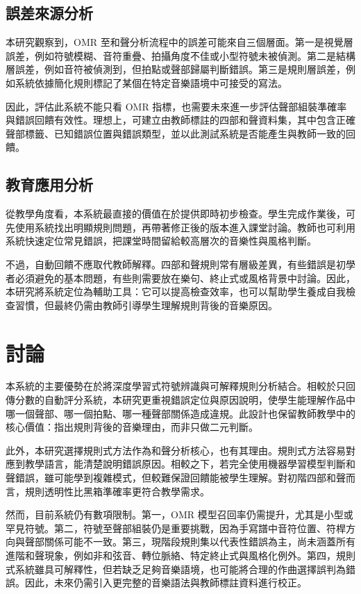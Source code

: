 \documentclass[12pt,a4paper]{article}
\begin{document}
\subsection{誤差來源分析}

本研究觀察到，OMR 至和聲分析流程中的誤差可能來自三個層面。第一是視覺層誤差，例如符號模糊、音符重疊、拍攝角度不佳或小型符號未被偵測。第二是結構層誤差，例如音符被偵測到，但拍點或聲部歸屬判斷錯誤。第三是規則層誤差，例如系統依據簡化規則標記了某個在特定音樂語境中可接受的寫法。

因此，評估此系統不能只看 OMR 指標，也需要未來進一步評估聲部組裝準確率與錯誤回饋有效性。理想上，可建立由教師標註的四部和聲資料集，其中包含正確聲部標籤、已知錯誤位置與錯誤類型，並以此測試系統是否能產生與教師一致的回饋。

\subsection{教育應用分析}

從教學角度看，本系統最直接的價值在於提供即時初步檢查。學生完成作業後，可先使用系統找出明顯規則問題，再帶著修正後的版本進入課堂討論。教師也可利用系統快速定位常見錯誤，把課堂時間留給較高層次的音樂性與風格判斷。

不過，自動回饋不應取代教師解釋。四部和聲規則常有層級差異，有些錯誤是初學者必須避免的基本問題，有些則需要放在樂句、終止式或風格背景中討論。因此，本研究將系統定位為輔助工具：它可以提高檢查效率，也可以幫助學生養成自我檢查習慣，但最終仍需由教師引導學生理解規則背後的音樂原因。

\section{討論}

本系統的主要優勢在於將深度學習式符號辨識與可解釋規則分析結合。相較於只回傳分數的自動評分系統，本研究更重視錯誤定位與原因說明，使學生能理解作品中哪一個聲部、哪一個拍點、哪一種聲部關係造成違規。此設計也保留教師教學中的核心價值：指出規則背後的音樂理由，而非只做二元判斷。

此外，本研究選擇規則式方法作為和聲分析核心，也有其理由。規則式方法容易對應到教學語言，能清楚說明錯誤原因。相較之下，若完全使用機器學習模型判斷和聲錯誤，雖可能學到複雜模式，但較難保證回饋能被學生理解。對初階四部和聲而言，規則透明性比黑箱準確率更符合教學需求。

然而，目前系統仍有數項限制。第一，OMR 模型召回率仍需提升，尤其是小型或罕見符號。第二，符號至聲部組裝仍是重要挑戰，因為手寫譜中音符位置、符桿方向與聲部關係可能不一致。第三，現階段規則集以代表性錯誤為主，尚未涵蓋所有進階和聲現象，例如非和弦音、轉位脈絡、特定終止式與風格化例外。第四，規則式系統雖具可解釋性，但若缺乏足夠音樂語境，也可能將合理的作曲選擇誤判為錯誤。因此，未來仍需引入更完整的音樂語法與教師標註資料進行校正。
\end{document}
